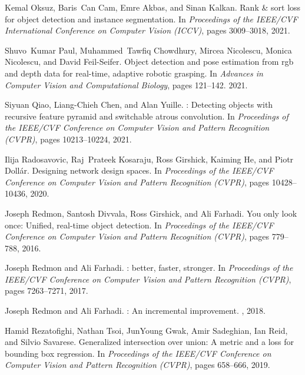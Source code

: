 \documentclass[10pt,twocolumn,letterpaper]{article}
\begin{document}
{\begin{thebibliography}{100}
				Kemal Oksuz, Baris~Can Cam, Emre Akbas, and Sinan Kalkan.
				\newblock Rank \& sort loss for object detection and instance segmentation.
				\newblock In {\em Proceedings of the IEEE/CVF International Conference on
					Computer Vision (ICCV)}, pages 3009--3018, 2021.
				
				Shuvo~Kumar Paul, Muhammed~Tawfiq Chowdhury, Mircea Nicolescu, Monica
				Nicolescu, and David Feil-Seifer.
				\newblock Object detection and pose estimation from rgb and depth data for
				real-time, adaptive robotic grasping.
				\newblock In {\em Advances in Computer Vision and Computational Biology}, pages
				121--142. 2021.
				
				Siyuan Qiao, Liang-Chieh Chen, and Alan Yuille.
				: Detecting objects with recursive feature pyramid and
				switchable atrous convolution.
				\newblock In {\em Proceedings of the IEEE/CVF Conference on Computer Vision and
					Pattern Recognition (CVPR)}, pages 10213--10224, 2021.
				
				Ilija Radosavovic, Raj~Prateek Kosaraju, Ross Girshick, Kaiming He, and Piotr
				Doll{\'a}r.
				\newblock Designing network design spaces.
				\newblock In {\em Proceedings of the IEEE/CVF Conference on Computer Vision and
					Pattern Recognition (CVPR)}, pages 10428--10436, 2020.
				
				Joseph Redmon, Santosh Divvala, Ross Girshick, and Ali Farhadi.
				\newblock You only look once: Unified, real-time object detection.
				\newblock In {\em Proceedings of the IEEE/CVF Conference on Computer Vision and
					Pattern Recognition (CVPR)}, pages 779--788, 2016.
				
				Joseph Redmon and Ali Farhadi.
				: better, faster, stronger.
				\newblock In {\em Proceedings of the IEEE/CVF Conference on Computer Vision and
					Pattern Recognition (CVPR)}, pages 7263--7271, 2017.
				
				Joseph Redmon and Ali Farhadi.
				: An incremental improvement.
				, 2018.
				
				Hamid Rezatofighi, Nathan Tsoi, JunYoung Gwak, Amir Sadeghian, Ian Reid, and
				Silvio Savarese.
				\newblock Generalized intersection over union: A metric and a loss for bounding
				box regression.
				\newblock In {\em Proceedings of the IEEE/CVF Conference on Computer Vision and
					Pattern Recognition (CVPR)}, pages 658--666, 2019.
				

\end{thebibliography}}
\end{document}
